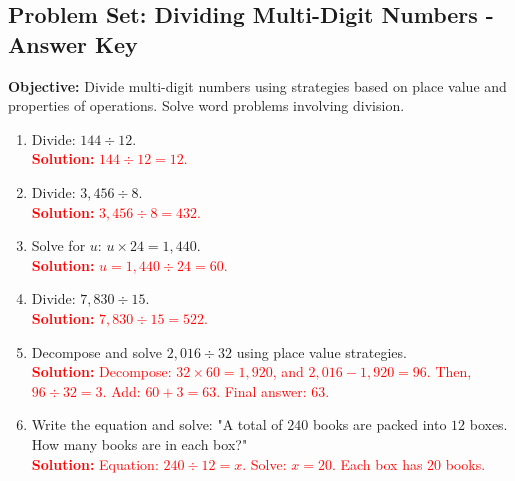 \documentclass[12pt]{article}
\title{}
\date{}
\begin{document}
\subsection*{Problem Set: Dividing Multi-Digit Numbers - Answer Key}
\onehalfspacing

\begin{tcolorbox}[colframe=black!40, colback=gray!5, 
coltitle=black, colbacktitle=black!20, fonttitle=\bfseries\Large, 
title=Learning Objective, halign title=center, left=5pt, right=5pt, top=5pt, bottom=15pt]
\textbf{Objective:} Divide multi-digit numbers using strategies based on place value and properties of operations. Solve word problems involving division.
\end{tcolorbox}

\begin{tcolorbox}[colframe=black!60, colback=white, 
coltitle=black, colbacktitle=black!15, fonttitle=\bfseries\Large, 
title=Exercises, halign title=center, left=10pt, right=10pt, top=10pt, bottom=60pt]
\begin{enumerate}[itemsep=3em]
    \item Divide: \( 144 \div 12 \).\\
    \textcolor{red}{\textbf{Solution:} \(144 \div 12 = 12\).}

    \item Divide: \( 3,456 \div 8 \).\\
    \textcolor{red}{\textbf{Solution:} \(3,456 \div 8 = 432\).}

    \item Solve for \( u \): \( u \times 24 = 1,440 \).\\
    \textcolor{red}{\textbf{Solution:} \( u = 1,440 \div 24 = 60\).}

    \item Divide: \( 7,830 \div 15 \).\\
    \textcolor{red}{\textbf{Solution:} \(7,830 \div 15 = 522\).}

    \item Decompose and solve \( 2,016 \div 32 \) using place value strategies.\\
    \textcolor{red}{\textbf{Solution:} Decompose: \(32 \times 60 = 1,920\), and \(2,016 - 1,920 = 96\). Then, \(96 \div 32 = 3\). Add: \(60 + 3 = 63\). Final answer: \(63\).}

    \item Write the equation and solve: "A total of \( 240 \) books are packed into \( 12 \) boxes. How many books are in each box?"\\
    \textcolor{red}{\textbf{Solution:} Equation: \(240 \div 12 = x\). Solve: \(x = 20\). Each box has \(20\) books.}


\end{enumerate}
\end{tcolorbox}
\end{document}
